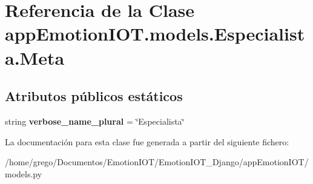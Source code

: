 \hypertarget{classappEmotionIOT_1_1models_1_1Especialista_1_1Meta}{}\section{Referencia de la Clase app\+Emotion\+I\+O\+T.\+models.\+Especialista.\+Meta}
\label{classappEmotionIOT_1_1models_1_1Especialista_1_1Meta}
\subsection*{Atributos públicos estáticos}
\begin{DoxyCompactItemize}
\item 
string {\bfseries verbose\+\_\+name\+\_\+plural} = \char`\"{}Especialista\char`\"{}\hypertarget{classappEmotionIOT_1_1models_1_1Especialista_1_1Meta_aa43aba5c8d6b1119e1c08eae6a7f023b}{}\label{classappEmotionIOT_1_1models_1_1Especialista_1_1Meta_aa43aba5c8d6b1119e1c08eae6a7f023b}

\end{DoxyCompactItemize}


La documentación para esta clase fue generada a partir del siguiente fichero\+:\begin{DoxyCompactItemize}
\item 
/home/grego/\+Documentos/\+Emotion\+I\+O\+T/\+Emotion\+I\+O\+T\+\_\+\+Django/app\+Emotion\+I\+O\+T/models.\+py\end{DoxyCompactItemize}
